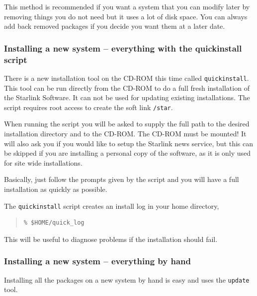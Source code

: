 \documentclass[twoside,11pt]{article}
\newcommand{\xlabel}[1]{}
\renewcommand{\_}{\texttt{\symbol{95}}}
\begin{document}
This method is recommended if you want a system that you can modify
later by removing things you do not need but it uses a lot of disk space.
You can always add back removed packages if you decide you want them at
a later date.

\subsubsection{\xlabel{installing_a_new_system-everything_quick_install}Installing a new system -- everything
with the quick\_install script}
\label{installing_a_new_system-everything_quick_install}

There is a new installation tool on the CD-ROM this time called \texttt{quick\_install}.
This tool can be run directly from the CD-ROM to do a full fresh installation of
the Starlink Software. It can not be used for updating existing installations.
The script requires root access to create the soft link \texttt{/star}.

When running the script you will be asked to supply the full path to the
desired installation directory and to the CD-ROM. The CD-ROM must be mounted!
It will also ask you if you would like to setup the Starlink news service,
but this can be skipped if you are installing a personal copy of the software,
as it is only used for site wide installations.

Basically, just follow the prompts given by the script and you will have a
full installation as quickly as possible.

The \texttt{quick\_install} script creates an install log in your home directory,

\begin{quote}
\begin{verbatim}
% $HOME/quick_log
\end{verbatim}
\end{quote}

This will be useful to diagnose problems if the installation should fail.

\subsubsection{\xlabel{installing_a_new_system-everything_quick_install}Installing a new system -- everything
by hand}
\label{installing_a_new_system-everything_by_hand}

Installing all the packages on a new system by hand is easy and uses the
\texttt{update} tool.
\end{document}
